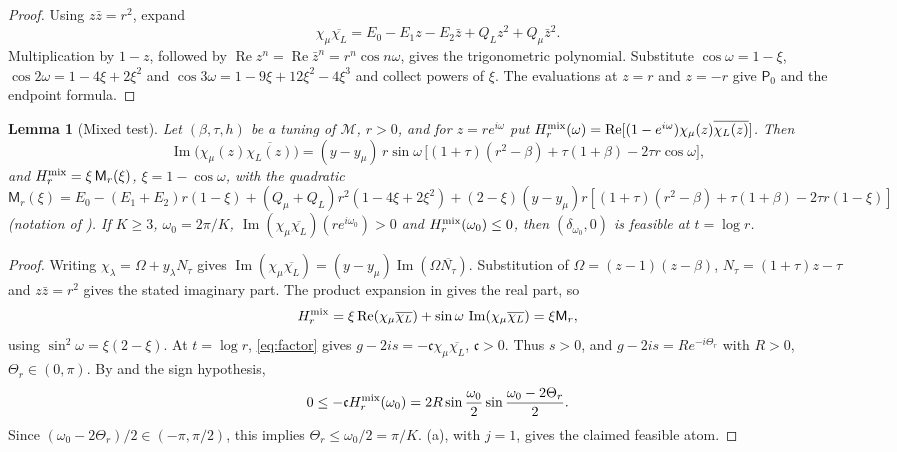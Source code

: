\documentclass[11pt]{article}
\newtheorem{lemma}[theorem]{Lemma}
\theoremstyle{definition}
\theoremstyle{remark}
\newcommand{\cM}{\mathcal M}
\newcommand{\sfP}{\mathsf P}
\newcommand{\Rea}{\operatorname{Re}}
\newcommand{\Ima}{\operatorname{Im}}
\begin{document}
\begin{proof}
Using \(z\bar z=r^2\), expand
\[
\chi_\mu\overline{\chi_L}=E_0-E_1z-E_2\bar z+Q_Lz^2+Q_\mu\bar z^2.
\]
Multiplication by \(1-z\), followed by
\(\Rea z^n=\Rea\bar z^n=r^n\cos n\omega\), gives the trigonometric polynomial.
Substitute \(\cos\omega=1-\xi\),
\(\cos2\omega=1-4\xi+2\xi^2\) and
\(\cos3\omega=1-9\xi+12\xi^2-4\xi^3\) and collect powers of \(\xi\).
The evaluations at \(z=r\) and \(z=-r\) give \(\sfP_0\) and the endpoint formula.
\end{proof}
\begin{lemma}[Mixed test]\label{lem:mixed}
Let \((\beta,\tau,h)\) be a tuning of \(\cM\), \(r>0\), and for \(z=re^{i\omega}\) put
\(H^{\rm mix}_r(\omega)=\Rea[(1-e^{i\omega})\chi_\mu(z)\overline{\chi_L(z)}]\).  Then
\[
\Ima\bigl(\chi_\mu(z)\overline{\chi_L(z)}\bigr)=(y-y_\mu)\,r\sin\omega\,
\bigl[(1+\tau)(r^2-\beta)+\tau(1+\beta)-2\tau r\cos\omega\bigr],
\]
and \(H^{\rm mix}_r=\xi\,\mathsf M_r(\xi)\), \(\xi=1-\cos\omega\), with the quadratic
\(\mathsf M_r(\xi)=E_0-(E_1+E_2)r(1-\xi)+(Q_\mu+Q_L)r^2(1-4\xi+2\xi^2)
+(2-\xi)(y-y_\mu)r[(1+\tau)(r^2-\beta)+\tau(1+\beta)-2\tau r(1-\xi)]\) (notation of
).  If \(K\ge3\), \(\omega_0=2\pi/K\),
\(\Ima(\chi_\mu\overline{\chi_L})(re^{i\omega_0})>0\) and \(H^{\rm mix}_r(\omega_0)\le0\), then \((\delta_{\omega_0},0)\)
is feasible at \(t=\log r\).
\end{lemma}

\begin{proof}
Writing \(\chi_\lambda=\Omega+y_\lambda N_\tau\) gives
\(\Ima(\chi_\mu\overline{\chi_L})=(y-y_\mu)\Ima(\Omega\overline{N_\tau})\).
Substitution of \(\Omega=(z-1)(z-\beta)\), \(N_\tau=(1+\tau)z-\tau\) and
\(z\bar z=r^2\) gives the stated imaginary part.  The product expansion in  gives the real part, so
\[
H^{\rm mix}_r=\xi\Rea(\chi_\mu\overline{\chi_L})
+\sin\omega\,\Ima(\chi_\mu\overline{\chi_L})=\xi\mathsf M_r,
\]
using \(\sin^2\omega=\xi(2-\xi)\).
At \(t=\log r\), \eqref{eq:factor} gives
\(g-2is=-\mathfrak c\chi_\mu\overline{\chi_L}\), \(\mathfrak c>0\).
Thus \(s>0\), and \(g-2is=Re^{-i\Theta_r}\) with \(R>0\), \(\Theta_r\in(0,\pi)\).
By  and the sign hypothesis,
\[
0\le-\mathfrak c H^{\rm mix}_r(\omega_0)
=2R\sin\frac{\omega_0}2\sin\frac{\omega_0-2\Theta_r}2.
\]
Since \((\omega_0-2\Theta_r)/2\in(-\pi,\pi/2)\), this implies
\(\Theta_r\le\omega_0/2=\pi/K\).
(a), with \(j=1\), gives the claimed feasible atom.
\end{proof}
\end{document}
